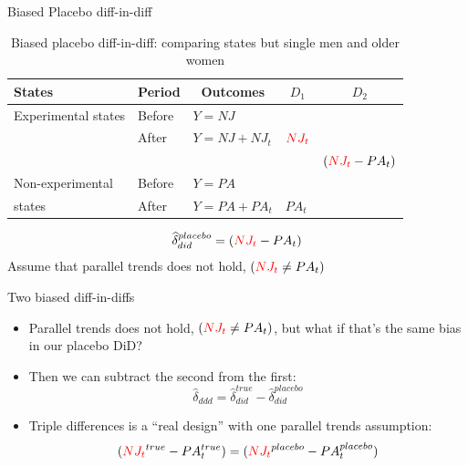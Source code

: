 \documentclass[aspectratio=169,11pt]{beamer}
\begin{document}
\begin{frame}{Biased Placebo diff-in-diff}

\begin{table}\centering
\scriptsize
		\caption{Biased placebo diff-in-diff: comparing states but single men and older women}
		\begin{center}
		\begin{tabular}{lll|lc}
		\toprule
		\multicolumn{1}{l}{\textbf{States}}&
		\multicolumn{1}{c}{\textbf{Period}}&
		\multicolumn{1}{c}{\textbf{Outcomes}}&
		\multicolumn{1}{c}{$D_1$}&
		\multicolumn{1}{c}{$D_2$}\\
		\midrule
		Experimental states & Before & $Y=NJ$ \\
		& After & $Y=NJ + NJ_t $ & $\textcolor{red}{NJ_t}$\\
		\midrule
		& & & & $ (\textcolor{red}{NJ_t}- PA_t)$ \\
		\midrule
		Non-experimental  & Before & $Y=PA$ \\
		states& After & $Y=PA + PA_t$ & $PA_t$\\
		\bottomrule
		\end{tabular}
		\end{center}
	\end{table}

\begin{eqnarray*}
\widehat{\delta}^{placebo}_{did} = (\textcolor{red}{NJ_t}- PA_t)
\end{eqnarray*}Assume that parallel trends does not hold, $(\textcolor{red}{NJ_t} \neq PA_t)$

\end{frame}


\begin{frame}{Two biased diff-in-diffs}

\begin{itemize}


\item Parallel trends does not hold, $(\textcolor{red}{NJ_t} \neq PA_t)$, but what if that's the same bias in our placebo DiD?
\item Then we can subtract the second from the first: $$ \widehat{\delta}_{ddd} = \widehat{\delta}^{true}_{did} - \widehat{\delta}^{placebo}_{did}$$
\item Triple differences is a ``real design'' with one parallel trends assumption: $$(\textcolor{red}{NJ_t}^{true}- PA_t^{true}) = (\textcolor{red}{NJ_t}^{placebo}- PA_t^{placebo})$$

\end{itemize}

\end{frame}
\end{document}
